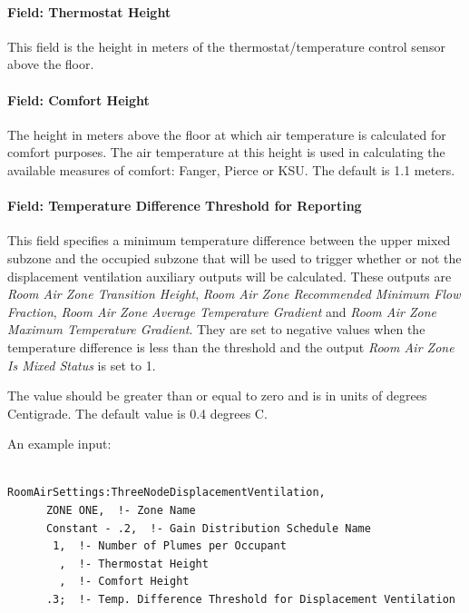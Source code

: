 \paragraph{Field: Thermostat Height}\label{field-thermostat-height-1}

This field is the height in meters of the thermostat/temperature control sensor above the floor.

\paragraph{Field: Comfort Height}\label{field-comfort-height}

The height in meters above the floor at which air temperature is calculated for comfort purposes. The air temperature at this height is used in calculating the available measures of comfort: Fanger, Pierce or KSU. The default is 1.1 meters.

\paragraph{Field: Temperature Difference Threshold for Reporting}\label{field-temperature-difference-threshold-for-reporting}

This field specifies a minimum temperature difference between the upper mixed subzone and the occupied subzone that will be used to trigger whether or not the displacement ventilation auxiliary outputs will be calculated. These outputs are \emph{Room Air Zone Transition Height}, \emph{Room Air Zone Recommended Minimum Flow Fraction}, \emph{Room Air Zone Average Temperature Gradient} and \emph{Room Air Zone Maximum Temperature Gradient}. They are set to negative values when the temperature difference is less than the threshold and the output \emph{Room Air Zone Is Mixed Status} is set to 1.

The value should be greater than or equal to zero and is in units of degrees Centigrade. The default value is 0.4 degrees C.

An example input:

\begin{lstlisting}

RoomAirSettings:ThreeNodeDisplacementVentilation,
      ZONE ONE,  !- Zone Name
      Constant - .2,  !- Gain Distribution Schedule Name
       1,  !- Number of Plumes per Occupant
        ,  !- Thermostat Height
        ,  !- Comfort Height
      .3;  !- Temp. Difference Threshold for Displacement Ventilation
\end{lstlisting}

